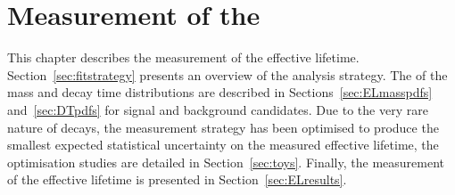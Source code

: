 \chapter{{\bf Measurement of the }}
\label{sec:lifetimemeasurement}

This chapter describes the measurement of the \bsmumu effective lifetime. %
Section~\ref{sec:fitstrategy} presents an overview of the analysis strategy. %
The \pdfs of the mass and decay time distributions are described in Sections~\ref{sec:ELmasspdfs} and~\ref{sec:DTpdfs} for signal and background candidates. Due to the very rare nature of \bsmumu decays, the measurement strategy has been optimised to produce the smallest expected statistical uncertainty on the measured \bsmumu effective lifetime, the optimisation studies are detailed in Section~\ref{sec:toys}. Finally, the measurement of the \bsmumu effective lifetime is presented in Section~\ref{sec:ELresults}.







